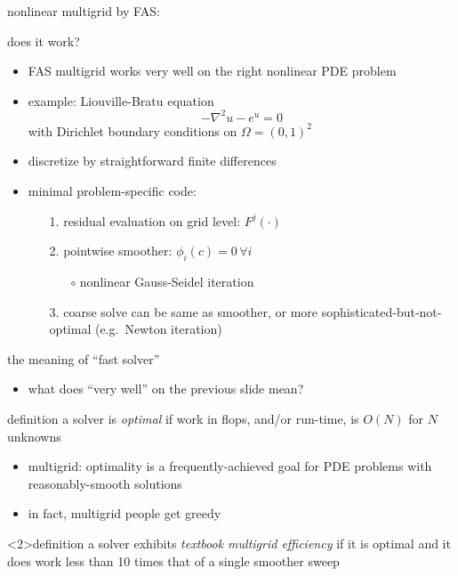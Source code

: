 \documentclass[svgnames,
               hyperref={colorlinks,citecolor=DeepPink4,linkcolor=FireBrick,urlcolor=Maroon},
               usepdftitle=false]  %
               {beamer}
\begin{document}
\begin{frame}{nonlinear multigrid by FAS: }
{\hfill 

\vspace{6mm}
}
\end{frame}


\begin{frame}{does it work?}

\begin{itemize}
\item FAS multigrid works \alert{very well} on the right nonlinear PDE problem
\item example: Liouville-Bratu equation
    $$-\nabla^2 u - e^u = 0$$
with Dirichlet boundary conditions on $\Omega=(0,1)^2$
\item discretize by straightforward finite differences
\item minimal problem-specific code:
    \begin{enumerate}
    \item[1.] residual evaluation on grid level: $F^j(\cdot)$
    \item[2.] pointwise smoother: $\phi_i(c) = 0 \,\forall i$
        \begin{itemize}
        \item[$\circ$] nonlinear Gauss-Seidel iteration
        \end{itemize}
    \item[3.] coarse solve can be same as smoother, or more sophisticated-but-not-optimal (e.g.~Newton iteration)
    \end{enumerate}
\end{itemize}
\end{frame}


\begin{frame}{the meaning of ``fast solver''}

\begin{itemize}
\item what does ``very well'' on the previous slide mean?
\end{itemize}

\begin{block}{definition} a solver is \emph{optimal} if work in flops, and/or run-time, is $O(N)$ for $N$ unknowns
\end{block}

\begin{itemize}
\item multigrid: optimality is a frequently-achieved goal for PDE problems with reasonably-smooth solutions
\item<2> in fact, multigrid people get greedy
\end{itemize}

\begin{block}<2>{definition} a solver exhibits \emph{textbook multigrid efficiency} if it is optimal and it does work less than 10 times that of a single smoother sweep
\end{block}
\end{frame}
\end{document}
